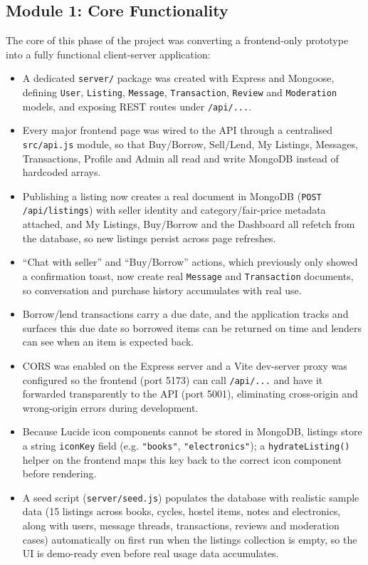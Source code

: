 \documentclass[12pt]{report}
\begin{document}
\subsection{Module 1: Core Functionality}
The core of this phase of the project was converting a frontend-only prototype into a fully
functional client-server application:
\begin{itemize}
    \item A dedicated \texttt{server/} package was created with Express and Mongoose, defining
    \texttt{User}, \texttt{Listing}, \texttt{Message}, \texttt{Transaction}, \texttt{Review}
    and \texttt{Moderation} models, and exposing REST routes under \texttt{/api/...}.
    \item Every major frontend page was wired to the API through a centralised
    \texttt{src/api.js} module, so that Buy/Borrow, Sell/Lend, My Listings, Messages,
    Transactions, Profile and Admin all read and write MongoDB instead of hardcoded arrays.
    \item Publishing a listing now creates a real document in MongoDB (\texttt{POST
    /api/listings}) with seller identity and category/fair-price metadata attached, and My
    Listings, Buy/Borrow and the Dashboard all refetch from the database, so new listings
    persist across page refreshes.
    \item ``Chat with seller'' and ``Buy/Borrow'' actions, which previously only showed a
    confirmation toast, now create real \texttt{Message} and \texttt{Transaction} documents,
    so conversation and purchase history accumulates with real use.
    \item Borrow/lend transactions carry a due date, and the application tracks and surfaces
    this due date so borrowed items can be returned on time and lenders can see when an item
    is expected back.
    \item CORS was enabled on the Express server and a Vite dev-server proxy was configured
    so the frontend (port 5173) can call \texttt{/api/...} and have it forwarded transparently
    to the API (port 5001), eliminating cross-origin and wrong-origin errors during
    development.
    \item Because Lucide icon components cannot be stored in MongoDB, listings store a string
    \texttt{iconKey} field (e.g. \texttt{"books"}, \texttt{"electronics"}); a
    \texttt{hydrateListing()} helper on the frontend maps this key back to the correct icon
    component before rendering.
    \item A seed script (\texttt{server/seed.js}) populates the database with realistic sample
    data (15 listings across books, cycles, hostel items, notes and electronics, along with
    users, message threads, transactions, reviews and moderation cases) automatically on
    first run when the listings collection is empty, so the UI is demo-ready even before real
    usage data accumulates.
\end{itemize}
\end{document}
